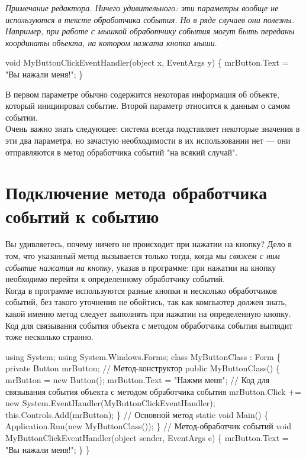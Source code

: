 \documentclass[12pt, a4paper]{article}
\begin{document}
\textit{Примечание редактора. Ничего удивительного: эти параметры вообще не используются в тексте обработчика события. Но в ряде случаев они полезны. Например, при работе с мышкой обработчику события могут быть переданы координаты объекта, на котором нажата кнопка мыши}.
\begin{spverbatim}void MyButtonClickEventHandler(object x, EventArgs y)
\{
  mrButton.Text = "Вы нажали меня!";
\}\end{spverbatim}

В первом параметре обычно содержится некоторая информация об объекте, который инициировал событие. Второй параметр относится к данным о самом событии.\\

Очень важно знать следующее: система всегда подставляет некоторые значения в эти два параметра, но зачастую необходимости в их использовании нет — они отправляются в метод обработчика событий "на всякий случай".\\

\section{Подключение метода обработчика событий к событию}
Вы удивляетесь, почему ничего не происходит при нажатии на кнопку? Дело в том, что указанный метод вызывается только тогда, когда мы \textit{свяжем с ним событие нажатия на кнопку}, указав в программе: при нажатии на кнопку необходимо перейти к определенному обработчику событий.\\

Когда в программе используются разные кнопки и несколько обработчиков событий, без такого уточнения не обойтись, так как компьютер должен знать, какой именно метод следует выполнять при нажатии на определенную кнопку.\\

Код для связывания события объекта с методом обработчика события выглядит тоже несколько странно.\\

\begin{spverbatim}using System;
using System.Windows.Forms;
class MyButtonClass : Form
\{
    private Button mrButton;
    // Метод-конструктор
    public MyButtonClass()
    \{
        mrButton = new Button();
        mrButton.Text = "Нажми меня";
        // Код для связывания события объекта с методом обработчика события 
        mrButton.Click += new System.EventHandler(MyButtonClickEventHandler);
        this.Controls.Add(mrButton);
    \}
    // Основной метод
    static void Main()
    \{
        Application.Run(new MyButtonClass());
    \}
    // Метод-обработчик событий
    void MyButtonClickEventHandler(object sender, EventArgs e)
    \{
        mrButton.Text = "Вы нажали меня!";
    \}
\}\end{spverbatim}
\end{document}
